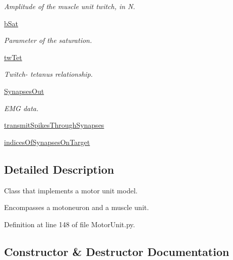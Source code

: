 \begin{DoxyCompactItemize}
\begin{DoxyCompactList}\small\item\em Amplitude of the muscle unit twitch, in N. \end{DoxyCompactList}\item 
\hyperlink{class_motor_unit_1_1_motor_unit_a2256c241b36e0181e3530e6f791545a0}{b\+Sat}
\begin{DoxyCompactList}\small\item\em Parameter of the saturation. \end{DoxyCompactList}\item 
\hyperlink{class_motor_unit_1_1_motor_unit_a2a466c5f2f798901c1c438f9d57c2221}{tw\+Tet}
\begin{DoxyCompactList}\small\item\em Twitch-\/ tetanus relationship. \end{DoxyCompactList}\item 
\hyperlink{class_motor_unit_1_1_motor_unit_a898cd628506c666bf326b02436be0750}{Synapses\+Out}
\begin{DoxyCompactList}\small\item\em E\+MG data. \end{DoxyCompactList}\item 
\hyperlink{class_motor_unit_1_1_motor_unit_a30fc94e8b9f24b75770bb903e20f1961}{transmit\+Spikes\+Through\+Synapses}
\item 
\hyperlink{class_motor_unit_1_1_motor_unit_a9b53efb19f9b1a050ef1c21af4316755}{indices\+Of\+Synapses\+On\+Target}
\end{DoxyCompactItemize}


\subsection{Detailed Description}
Class that implements a motor unit model. 

Encompasses a motoneuron and a muscle unit. 

Definition at line 148 of file Motor\+Unit.\+py.



\subsection{Constructor \& Destructor Documentation}
